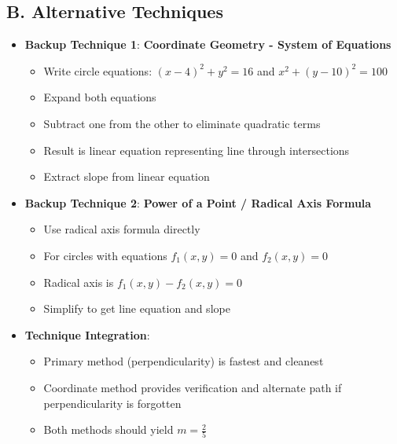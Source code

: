 \documentclass[12pt]{article}
\begin{document}
\begin{techniquesbox}
\subsection*{B. Alternative Techniques}
\begin{itemize}[leftmargin=*]
    \item \textbf{Backup Technique 1}: \textbf{Coordinate Geometry - System of Equations}
    \begin{itemize}
        \item Write circle equations: $(x-4)^2 + y^2 = 16$ and $x^2 + (y-10)^2 = 100$
        \item Expand both equations
        \item Subtract one from the other to eliminate quadratic terms
        \item Result is linear equation representing line through intersections
        \item Extract slope from linear equation
    \end{itemize}
    \item \textbf{Backup Technique 2}: \textbf{Power of a Point / Radical Axis Formula}
    \begin{itemize}
        \item Use radical axis formula directly
        \item For circles with equations $f_1(x,y) = 0$ and $f_2(x,y) = 0$
        \item Radical axis is $f_1(x,y) - f_2(x,y) = 0$
        \item Simplify to get line equation and slope
    \end{itemize}
    \item \textbf{Technique Integration}: 
    \begin{itemize}
        \item Primary method (perpendicularity) is fastest and cleanest
        \item Coordinate method provides verification and alternate path if perpendicularity is forgotten
        \item Both methods should yield $m = \frac{2}{5}$
    \end{itemize}
\end{itemize}
\end{techniquesbox}
\end{document}
